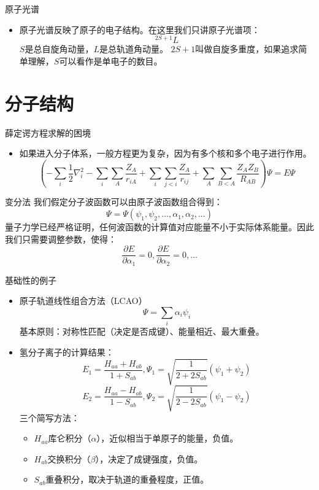 \documentclass[10pt,compress,t]{ctexbeamer}
\begin{document}
\begin{frame}{原子光谱}
\begin{itemize}
  \item 原子光谱反映了原子的电子结构。在这里我们只讲原子光谱项：
  $$^{2S+1} L$$
  $S$是总自旋角动量，$L$是总轨道角动量。
  $2S+1$叫做自旋多重度，如果追求简单理解，$S$可以看作是单电子的数目。
\end{itemize}
\end{frame}

\section{分子结构}

\begin{frame}{薛定谔方程求解的困境}
  \begin{itemize}
    \item 如果进入分子体系，一般方程更为复杂，因为有多个核和多个电子进行作用。
    $$ (-\sum_i \frac{1}{2} \nabla_i ^2 - \sum_i \sum_A \frac{Z_A}{r_{iA}} + \sum_i \sum_{j<i} \frac{Z_A}{r_{ij}} + \sum_A \sum_{B<A} \frac{Z_A Z_B}{R_{AB}} ) \Psi = E \Psi $$
  \end{itemize}
  \begin{block}{变分法}
    我们假定分子波函数可以由原子波函数组合得到：
    $$ \Psi = \Psi(\psi_1,\psi_2, ... , \alpha_1, \alpha_2, ... ) $$
    量子力学已经严格证明，任何波函数的计算值对应能量不小于实际体系能量。因此我们只需要调整参数，使得：
    $$ \frac{\partial E}{\partial \alpha_1} = 0,  \frac{\partial E}{\partial \alpha_2} = 0, \dots$$
  \end{block}
\end{frame}

\begin{frame}{基础性的例子}
  \begin{itemize}
    \item 原子轨道线性组合方法（LCAO）
    $$ \Psi = \sum_i \alpha_i \psi_i $$
    基本原则：对称性匹配（决定是否成键）、能量相近、最大重叠。
    \item 氢分子离子的计算结果：
    $$ E_1 = \frac{H_{aa}+H_{ab}}{1+S_{ab}}, \Psi_1 = \sqrt{\frac{1}{2+2S_{ab}}} (\psi_1 + \psi_2)$$
    $$ E_2 = \frac{H_{aa}-H_{ab}}{1-S_{ab}}, \Psi_2 = \sqrt{\frac{1}{2-2S_{ab}}} (\psi_1 - \psi_2)$$
    三个简写方法：
    \begin{itemize}
      \item $H_{aa}$库仑积分（$\alpha$），近似相当于单原子的能量，负值。
      \item $H_{ab}$交换积分（$\beta$），决定了成键强度，负值。
      \item $S_{ab}$重叠积分，取决于轨道的重叠程度，正值。
    \end{itemize}
  \end{itemize}
\end{frame}
\end{document}
